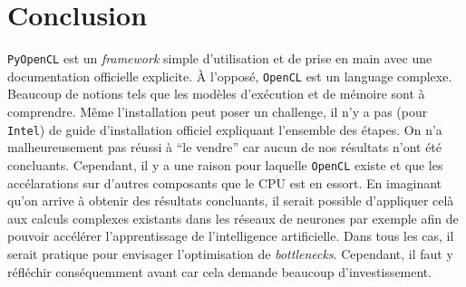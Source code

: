 \section{Conclusion}

\texttt{PyOpenCL} est un \textit{framework} simple d'utilisation et de prise en main 
avec une documentation officielle explicite. À l'opposé,
\texttt{OpenCL} est un language complexe. Beaucoup de notions tels que les 
modèles d'exécution et de mémoire sont à comprendre.
Même l'installation peut poser un challenge, il n'y a pas (pour \texttt{Intel}) 
de guide d'installation officiel expliquant l'ensemble des étapes. On n'a malheureusement 
pas réussi à ``le vendre'' car aucun de nos résultats n'ont été concluants. 
Cependant, il y a une raison pour laquelle \texttt{OpenCL} existe et que les
accélarations sur d'autres composants que le CPU est en essort. En imaginant qu'on 
arrive à obtenir des résultats concluants, il serait possible d'appliquer celà 
aux calculs complexes existants dans les réseaux de neurones par exemple afin 
de pouvoir accélérer l'apprentissage de l'intelligence artificielle. Dans tous 
les cas, il serait pratique pour envisager l'optimisation de \textit{bottlenecks}.
Cependant, il faut y réfléchir conséquemment avant car cela demande beaucoup 
d'investissement.
